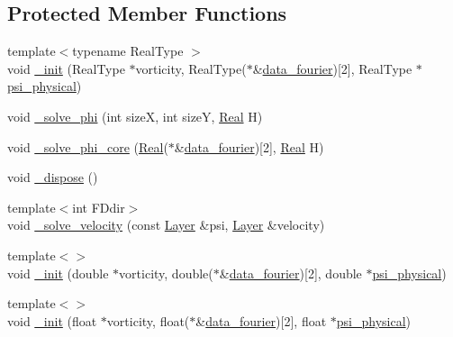 \subsection*{Protected Member Functions}
\begin{DoxyCompactItemize}
\item 
{\footnotesize template$<$typename Real\+Type $>$ }\\void \hyperlink{class_velocity_solver___f_f_t_w_abdfd608707a973bbbf83a1c3fabec7c7}{\+\_\+init} (Real\+Type $\ast$vorticity, Real\+Type($\ast$\&\hyperlink{class_velocity_solver___f_f_t_w_a589908f23d4caf65f23017d816c81dce}{data\+\_\+fourier})\mbox{[}2\mbox{]}, Real\+Type $\ast$\hyperlink{class_velocity_solver___f_f_t_w_ac0176cfda775251bb353dc0fdd3a21a4}{psi\+\_\+physical})
\item 
void \hyperlink{class_velocity_solver___f_f_t_w_a58ab8fe9aebab8bbdb516fdfd527848a}{\+\_\+solve\+\_\+phi} (int size\+X, int size\+Y, \hyperlink{_h_d_f5_dumper_8h_a445a5f0e2a34c9d97d69a3c2d1957907}{Real} H)
\item 
void \hyperlink{class_velocity_solver___f_f_t_w_a91285c45bc852d516b7ce421669f0b35}{\+\_\+solve\+\_\+phi\+\_\+core} (\hyperlink{_h_d_f5_dumper_8h_a445a5f0e2a34c9d97d69a3c2d1957907}{Real}($\ast$\&\hyperlink{class_velocity_solver___f_f_t_w_a589908f23d4caf65f23017d816c81dce}{data\+\_\+fourier})\mbox{[}2\mbox{]}, \hyperlink{_h_d_f5_dumper_8h_a445a5f0e2a34c9d97d69a3c2d1957907}{Real} H)
\item 
void \hyperlink{class_velocity_solver___f_f_t_w_ae093f8304949af0da930801698b00b87}{\+\_\+dispose} ()
\item 
{\footnotesize template$<$int F\+Ddir$>$ }\\void \hyperlink{class_velocity_solver___f_f_t_w_aa21455721c66e3c1ccb3f500ca25e769}{\+\_\+solve\+\_\+velocity} (const \hyperlink{struct_layer}{Layer} \&psi, \hyperlink{struct_layer}{Layer} \&velocity)
\item 
{\footnotesize template$<$$>$ }\\void \hyperlink{class_velocity_solver___f_f_t_w_a53606eb60568de76bc3e1e10fc1058f0}{\+\_\+init} (double $\ast$vorticity, double($\ast$\&\hyperlink{class_velocity_solver___f_f_t_w_a589908f23d4caf65f23017d816c81dce}{data\+\_\+fourier})\mbox{[}2\mbox{]}, double $\ast$\hyperlink{class_velocity_solver___f_f_t_w_ac0176cfda775251bb353dc0fdd3a21a4}{psi\+\_\+physical})
\item 
{\footnotesize template$<$$>$ }\\void \hyperlink{class_velocity_solver___f_f_t_w_a19b4ffcddba24dd983bfea58870e8718}{\+\_\+init} (float $\ast$vorticity, float($\ast$\&\hyperlink{class_velocity_solver___f_f_t_w_a589908f23d4caf65f23017d816c81dce}{data\+\_\+fourier})\mbox{[}2\mbox{]}, float $\ast$\hyperlink{class_velocity_solver___f_f_t_w_ac0176cfda775251bb353dc0fdd3a21a4}{psi\+\_\+physical})
\end{DoxyCompactItemize}
